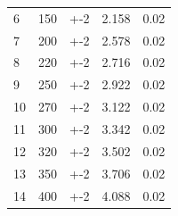 \documentclass[11pt,ngerman]{scrartcl}
\begin{document}
\begin{table}[H]
\begin{tabular}{l|S|S|S|S}
		6   & 150         & +-2            & 2.158              & 0.02                      \\
		7   & 200         & +-2            & 2.578              & 0.02                      \\
		8   & 220         & +-2            & 2.716              & 0.02                      \\
		9   & 250         & +-2            & 2.922              & 0.02                      \\
		10  & 270         & +-2            & 3.122              & 0.02                      \\
		11  & 300         & +-2            & 3.342              & 0.02                      \\
		12  & 320         & +-2            & 3.502              & 0.02                      \\
		13  & 350         & +-2            & 3.706              & 0.02                      \\
		14  & 400         & +-2            & 4.088              & 0.02                      \\
	\end{tabular}
\end{table}
\end{document}
